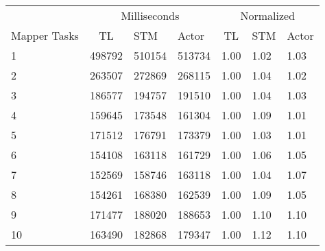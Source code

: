 \begin{center}
\begin{table}[h]
\centering
\begin{tabular}{l|cll|cll}
             & \multicolumn{3}{c|}{Milliseconds} & \multicolumn{3}{c}{Normalized} \\
Mapper Tasks & TL     & STM     & Actor     & TL      & STM      & Actor     \\ \hline
1                   &     498792      &      510154      &    513734  &	 1.00   & 1.02 &    1.03    \\
2                   &     263507      &      272869      &    268115  &  1.00   & 1.04 &    1.02    \\
3                   &     186577      &      194757      &    191510  &  1.00   & 1.04 &    1.03    \\
4                   &     159645      &      173548      &    161304  &  1.00   & 1.09 &    1.01    \\
5                   &     171512      &      176791      &    173379  &  1.00   & 1.03 &    1.01    \\
6                   &     154108      &      163118      &    161729  &  1.00   & 1.06 &    1.05    \\
7                   &     152569      &      158746      &    163118  &  1.00   & 1.04 &    1.07    \\
8                   &     154261      &      168380      &    162539  &  1.00   & 1.09 &    1.05    \\
9                   &     171477      &      188020      &    188653  &  1.00   & 1.10 &    1.10    \\
10                 &     163490      &      182868      &    179347  &	 1.00   & 1.12 &    1.10    \\
\end{tabular}
\label{table:test_results_concurrent_tasksc}
\end{table}
\end{center}
%
